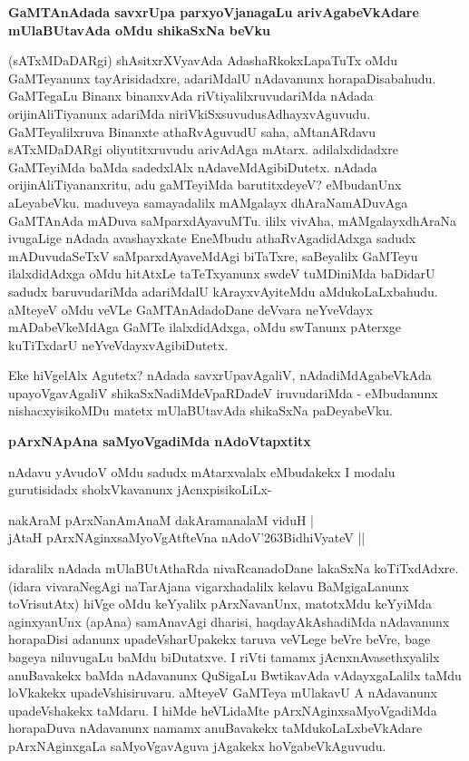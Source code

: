 {\bigskip
\noindent
{\large\bf GaMTAnAdada savxrUpa parxyoVjanagaLu arivAgabeVkAdare mUlaBUtavAda oMdu shikaSxNa beVku}}\label{page169a}
\medskip

\noindent
(sATxMDaDARgi) shAsitxrXVyavAda AdashaRkokxLapaTuTx oMdu GaMTeyanunx tayArisidadxre, adariMdalU nAdavanunx horapaDisabahudu. GaMTegaLu Binanx binanxvAda riVtiyalilxruvudariMda nAdada orijinAliTiyanunx adariMda niriVkiSxsuvudusAdhayxvAguvudu. GaMTeyalilxruva Binanxte athaRvAguvudU saha, aMtanARdavu sATxMDaDARgi oliyutitxruvudu arivAdAga mAtarx. adilalxdidadxre GaMTeyiMda baMda sadedxlAlx nAdaveMdAgibiDutetx. nAdada orijinAliTiyananxritu, adu gaMTeyiMda barutitxdeyeV? eMbudanUnx aLeyabeVku. maduveya samayadalilx mAMgalayx dhAraNamADuvAga GaMTAnAda mADuva saMparxdAyavuMTu. ililx vivAha, mAMgalayxdhAraNa ivugaLige nAdada avashayxkate EneMbudu athaRvAgadidAdxga sadudx mADuvudaSeTxV saMparxdAyaveMdAgi biTaTxre, saBeyalilx GaMTeyu ilalxdidAdxga oMdu hitAtxLe taTeTxyanunx swdeV tuMDiniMda baDidarU sadudx baruvudariMda adariMdalU kArayxvAyiteMdu aMdukoLaLxbahudu. aMteyeV oMdu veVLe GaMTAnAdadoDane deVvara neYveVdayx mADabeVkeMdAga GaMTe ilalxdidAdxga, oMdu swTanunx pAterxge kuTiTxdarU neYveVdayxvAgibiDutetx. 

Eke hiVgelAlx Agutetx? nAdada savxrUpavAgaliV, nAdadiMdAgabeVkAda upayoVgavAgaliV shikaSxNadiMdeVpaRDadeV iruvudariMda - eMbudanunx nishacxyisikoMDu matetx mUlaBUtavAda shikaSxNa paDeyabeVku.

{\bigskip
\noindent
{\large\bf pArxNApAna saMyoVgadiMda nAdoVtapxtitx}}\label{page170}
\medskip

\noindent
nAdavu yAvudoV oMdu sadudx mAtarxvalalx eMbudakekx I modalu gurutisidadx sholxVkavanunx jAcnxpisikoLiLx-

\begin{shloka}
nakAraM pArxNanAmAnaM dakAramanalaM viduH |\\\label{170}
jAtaH pArxNAginxsaMyoVgAtfteVna nAdoV\char'263BidhiVyateV ||
\end{shloka}

idaralilx nAdada mUlaBUtAthaRda nivaRcanadoDane lakaSxNa koTiTxdAdxre. (idara vivaraNegAgi naTarAjana vigarxhadalilx kelavu BaMgigaLanunx toVrisutAtx) hiVge oMdu keYyalilx pArxNavanUnx, matotxMdu keYyiMda aginxyanUnx (apAna) samAnavAgi dharisi, haqdayAkAshadiMda nAdavanunx horapaDisi adanunx upadeVsharUpakekx taruva veVLege beVre beVre, bage bageya niluvugaLu baMdu biDutatxve. I riVti tamamx jAcnxnAvasethxyalilx anuBavakekx baMda nAdavanunx QuSigaLu BwtikavAda vAdayxgaLalilx taMdu loVkakekx upadeVshisiruvaru. aMteyeV GaMTeya mUlakavU A nAdavanunx upadeVshakekx taMdaru. I hiMde heVLidaMte pArxNAginxsaMyoVgadiMda horapaDuva nAdavanunx namamx anuBavakekx taMdukoLaLxbeVkAdare pArxNAginxgaLa saMyoVgavAguva jAgakekx hoVgabeVkAguvudu.

